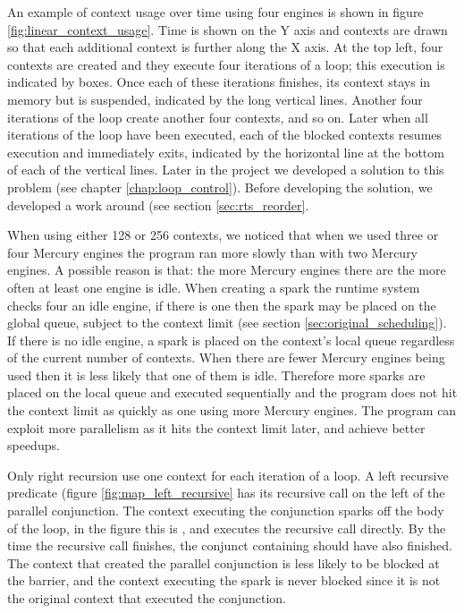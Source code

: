 
An example of context usage over time using four engines is shown in
figure \ref{fig:linear_context_usage}.
Time is shown on the Y axis and contexts are drawn so that each additional
context is further along the X axis.
At the top left,
four contexts are created and they execute four iterations of a loop;
this execution is indicated by boxes.
Once each of these iterations finishes,
its context stays in memory but is suspended,
indicated by the long vertical lines.
Another four iterations of the loop create another four contexts, and so on.
Later when all iterations of the loop have been executed,
each of the blocked contexts resumes execution and immediately exits,
indicated by the horizontal line at the bottom of each of the vertical
lines.
Later in the project we developed a solution to this problem
(see chapter \ref{chap:loop_control}).
Before developing the solution, we developed a work around (see section
\ref{sec:rts_reorder}.

When using either 128 or 256 contexts,
we noticed that when we used three or four Mercury engines
the program ran more slowly than with two Mercury engines.
A possible reason is that:
the more Mercury engines there are the more often at least one engine is
idle.
When creating a spark the runtime system checks four an idle engine,
if there is one then the spark may be placed on the global queue, subject to
    the context limit (see section \ref{sec:original_scheduling}).
If there is no idle engine,
a spark is placed on the context's local queue regardless of the current
number of contexts.
When there are fewer Mercury engines being used then it is less likely that
one of them is idle.
Therefore more sparks are placed on the local queue and executed
sequentially and the program does not hit the context limit as quickly as
one using more Mercury engines.
The program can exploit more parallelism as it hits the context limit
later,
and achieve better speedups.

Only right recursion use one context for each iteration of a loop. 
A left recursive predicate (figure \ref{fig:map_left_recursive} has its
recursive call on the left of the parallel conjunction.
The context executing the conjunction sparks off the body of the loop,
in the figure this is ,
and executes the recursive call directly.
By the time the recursive call finishes,
the conjunct containing  should have also finished.
The context that created the parallel conjunction is less likely to be
blocked at the barrier,
and the context executing the spark is never blocked since it is not the
original context that executed the conjunction.

